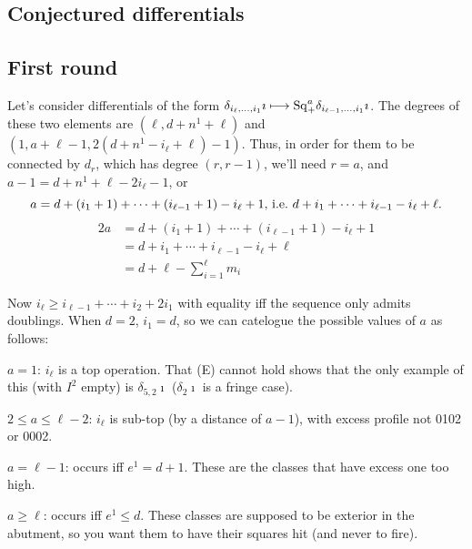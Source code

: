 \documentclass[10pt]{article}
\newcommand{\SqShift}{\Sq_{\smash{+}}}
\newcommand{\Sq}{\mathrm{Sq}}
\begin{document}
\begin{conjectured differentials}
\section{Conjectured differentials}
\subsection{First round}
Let's consider differentials of the form $\delta_{i_\ell,\ldots,i_1}\imath\mapsto \SqShift^a\delta_{i_{\ell-1},\ldots,i_1}\imath$. The degrees of these two elements are $(\ell,d+n^1+\ell)$ and $(1,a+\ell-1,2(d+n^1-i_\ell+\ell)-1)$. Thus, in order for them to be connected by $d_r$, which has degree $(r,r-1)$, we'll need $r=a$, and $a-1=d+n^1+\ell-2i_\ell-1$, or
\[a=d+(i_1+1)+\cdots +(i_{\ell-1}+1)-i_\ell+1\textup{, i.e.\ }d+i_1+\cdots +i_{\ell-1}-i_\ell+\ell.\]
\begin{alignat*}{2}
a
&=
d+(i_1+1)+\cdots +(i_{\ell-1}+1)-i_\ell+1%
\\
&=
d+i_1+\cdots +i_{\ell-1}-i_\ell+\ell\\
&=
d+\ell-\textstyle\sum_{i=1}^\ell m_i%
\end{alignat*}

Now $i_\ell\geq i_{\ell-1}+\cdots +i_2+2i_1$ with equality iff the sequence only admits doublings. When $d=2$, $i_1=d$, so we can catelogue the possible values of $a$ as follows:
\begin{itemise}
\setlength{\parindent}{.25in}
\item $a=1$: $i_\ell$ is a top operation. That (E) cannot hold shows that the only example of this (with $I^2$ empty) is $\delta_{5,2}\imath$ ($\delta_{2}\imath$ is a fringe case).
\item $2\leq a\leq\ell-2$: $i_\ell$ is sub-top (by a distance of $a-1$), with excess profile not 0102 or 0002.
\item $a=\ell-1$: occurs iff $e^1=d+1$. These are the classes that have excess one too high.
\item $a\geq\ell$:  occurs iff $e^1\leq d$. These classes are supposed to be exterior in the abutment, so you want them to have their squares hit (and never to fire).


\end{itemise}
\end{conjectured differentials}
\end{document}
